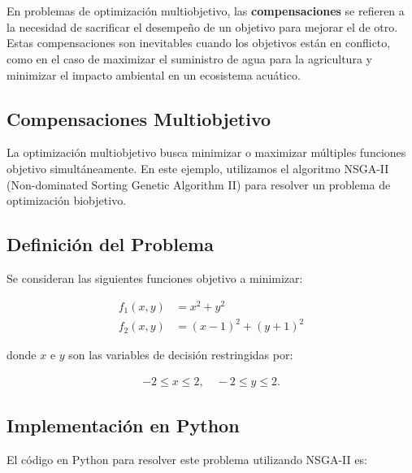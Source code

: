 \documentclass[12pt]{article}
\begin{document}
\section*{}
En problemas de optimización multiobjetivo, las \textbf{compensaciones} se refieren a la necesidad de sacrificar el desempeño de un objetivo para mejorar el de otro. Estas compensaciones son inevitables cuando los objetivos están en conflicto, como en el caso de maximizar el suministro de agua para la agricultura y minimizar el impacto ambiental en un ecosistema acuático.

\subsection*{Compensaciones Multiobjetivo}

La optimización multiobjetivo busca minimizar o maximizar múltiples funciones objetivo simultáneamente. En este ejemplo, utilizamos el algoritmo NSGA-II (Non-dominated Sorting Genetic Algorithm II) para resolver un problema de optimización biobjetivo.

\subsection*{Definición del Problema}

Se consideran las siguientes funciones objetivo a minimizar:

\begin{align}
	f_1(x, y) &= x^2 + y^2 \\
	f_2(x, y) &= (x - 1)^2 + (y + 1)^2
\end{align}

donde $x$ e $y$ son las variables de decisión restringidas por:

\begin{align}
	-2 \leq x \leq 2, \quad -2 \leq y \leq 2.
\end{align}

\subsection*{Implementación en Python}

El código en Python para resolver este problema utilizando NSGA-II es:
\end{document}
